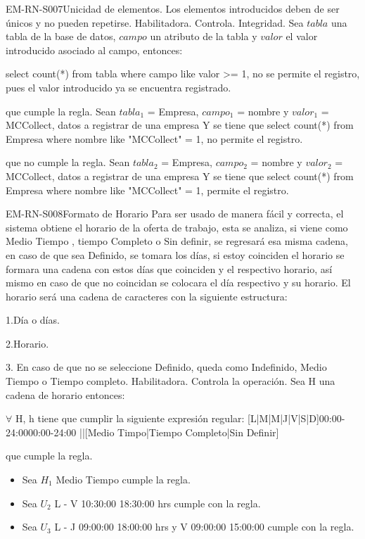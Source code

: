 \begin{BussinesRule}{EM-RN-S007}{Unicidad de elementos.} 
	\BRitem[Descripción:] Los elementos introducidos deben de ser únicos y no pueden repetirse. 
	\BRitem[Tipo:] Habilitadora.
	\BRitem[Nivel:] Controla.
	\BRitem[Clase:] Integridad.
	\BRitem[Sentencia:] Sea $tabla$ una tabla de la base de datos, $campo$ un atributo de la tabla y $valor$ el valor introducido asociado al campo, entonces:
	\begin{center}
		select count(*) from tabla where campo like valor >= 1, no se permite el registro, pues el valor introducido ya se encuentra registrado.
	\end{center}
	 que cumple la regla.
		Sean $tabla_{1}$ = Empresa, $campo_{1}$ = nombre y $valor_{1}$ = MCCollect, datos a registrar de una empresa
		Y se tiene que select count(*) from Empresa where nombre like "MCCollect" = 1, no permite el registro. 

	 que no cumple la regla.
		Sean $tabla_{2}$ = Empresa, $campo_{2}$ = nombre y $valor_{2}$ = MCCollect, datos a registrar de una empresa
		Y se tiene que select count(*) from Empresa where nombre like "MCCollect" = 1, permite el registro. 
\end{BussinesRule}


\begin{BussinesRule}{EM-RN-S008}{Formato de Horario}
	\BRitem[Descripción:] Para ser usado de manera fácil y correcta, el sistema obtiene el horario de la oferta de trabajo, esta se analiza, si viene como Medio Tiempo , tiempo Completo o Sin definir, se regresará esa misma cadena, en caso de que sea Definido, se tomara  los días, si estoy coinciden el horario se formara una cadena con estos días que coinciden y el respectivo horario, así mismo en caso de que no coincidan se colocara el día respectivo y su horario. El horario será una cadena de caracteres con la siguiente estructura:

1.Día o días.

2.Horario.

3. En caso de que no se seleccione Definido, queda como Indefinido, Medio Tiempo o Tiempo completo.
	\BRitem[Tipo:] Habilitadora.
	\BRitem[Nivel:] Controla la operación.
	\BRitem[Sentencia:] Sea H una cadena de horario  entonces: 
	\begin{center}
		$\forall$ H, h tiene que cumplir la siguiente expresión regular: [L|M|M|J|V|S|D]{00:00-24:00}{00:00-24:00} ||[Medio Timpo|Tiempo Completo|Sin Definir]
	\end{center}
	 que cumple la regla.
		\begin{itemize}
			\item Sea $H_{1}$ Medio Tiempo cumple la regla.
			\item Sea $U_{2}$ L - V 10:30:00 18:30:00 hrs cumple con la regla.
			\item Sea $U_{3}$ L - J 09:00:00 18:00:00 hrs y V 09:00:00 15:00:00 cumple con la regla.
		\end{itemize}

\end{BussinesRule}	

